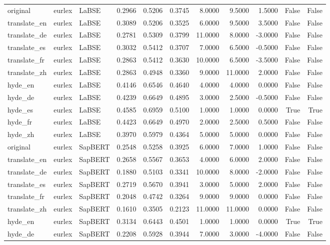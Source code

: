 \begin{tabular}{lllrrrrrrrr}
original & eurlex & LaBSE & 0.2966 & 0.5206 & 0.3745 & 8.0000 & 9.5000 & 1.5000 & False & False \\
translate\_en & eurlex & LaBSE & 0.3089 & 0.5206 & 0.3525 & 6.0000 & 9.5000 & 3.5000 & False & False \\
translate\_de & eurlex & LaBSE & 0.2781 & 0.5309 & 0.3799 & 11.0000 & 8.0000 & -3.0000 & False & False \\
translate\_es & eurlex & LaBSE & 0.3032 & 0.5412 & 0.3707 & 7.0000 & 6.5000 & -0.5000 & False & False \\
translate\_fr & eurlex & LaBSE & 0.2863 & 0.5412 & 0.3630 & 10.0000 & 6.5000 & -3.5000 & False & False \\
translate\_zh & eurlex & LaBSE & 0.2863 & 0.4948 & 0.3360 & 9.0000 & 11.0000 & 2.0000 & False & False \\
hyde\_en & eurlex & LaBSE & 0.4146 & 0.6546 & 0.4640 & 4.0000 & 4.0000 & 0.0000 & False & False \\
hyde\_de & eurlex & LaBSE & 0.4239 & 0.6649 & 0.4895 & 3.0000 & 2.5000 & -0.5000 & False & False \\
hyde\_es & eurlex & LaBSE & 0.4585 & 0.6959 & 0.5100 & 1.0000 & 1.0000 & 0.0000 & True & True \\
hyde\_fr & eurlex & LaBSE & 0.4423 & 0.6649 & 0.4970 & 2.0000 & 2.5000 & 0.5000 & False & False \\
hyde\_zh & eurlex & LaBSE & 0.3970 & 0.5979 & 0.4364 & 5.0000 & 5.0000 & 0.0000 & False & False \\
original & eurlex & SapBERT & 0.2548 & 0.5258 & 0.3925 & 6.0000 & 7.0000 & 1.0000 & False & False \\
translate\_en & eurlex & SapBERT & 0.2658 & 0.5567 & 0.3653 & 4.0000 & 6.0000 & 2.0000 & False & False \\
translate\_de & eurlex & SapBERT & 0.1880 & 0.5103 & 0.3341 & 10.0000 & 8.0000 & -2.0000 & False & False \\
translate\_es & eurlex & SapBERT & 0.2719 & 0.5670 & 0.3941 & 3.0000 & 5.0000 & 2.0000 & False & False \\
translate\_fr & eurlex & SapBERT & 0.2048 & 0.4742 & 0.3264 & 9.0000 & 9.0000 & 0.0000 & False & False \\
translate\_zh & eurlex & SapBERT & 0.1610 & 0.3505 & 0.2123 & 11.0000 & 11.0000 & 0.0000 & False & False \\
hyde\_en & eurlex & SapBERT & 0.3134 & 0.6443 & 0.4501 & 1.0000 & 1.0000 & 0.0000 & True & True \\
hyde\_de & eurlex & SapBERT & 0.2208 & 0.5928 & 0.3944 & 7.0000 & 3.0000 & -4.0000 & False & False \\

\end{tabular}
